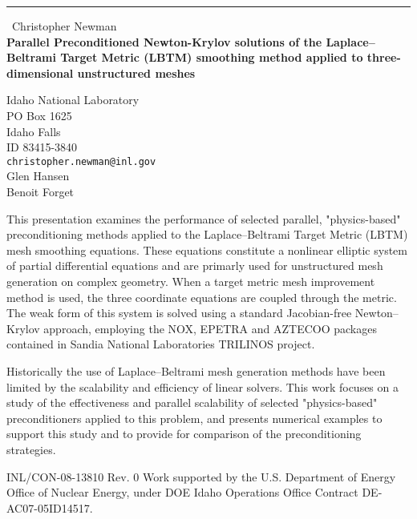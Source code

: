 \documentclass{report}
\begin{document}
\begin{center}
\rule{6in}{1pt} \
{\large Christopher Newman \\
{\bf Parallel Preconditioned Newton-Krylov solutions of the Laplace--Beltrami Target Metric (LBTM) smoothing method applied to three-dimensional unstructured meshes}}

Idaho National Laboratory \\ PO Box 1625 \\ Idaho Falls \\ ID 83415-3840
\\
{\tt christopher.newman@inl.gov}\\
Glen Hansen\\
Benoit Forget\end{center}

This presentation examines the performance of selected parallel,
"physics-based" preconditioning methods applied
to the Laplace--Beltrami Target Metric (LBTM) mesh smoothing equations.
These equations constitute a nonlinear elliptic
system of partial differential equations and are primarly used for unstructured mesh
generation on complex geometry. When a target metric mesh improvement
method is used, the three coordinate
equations are coupled through the metric. The weak form of this system
is solved using a standard Jacobian-free Newton--Krylov approach,
employing the NOX, EPETRA
and AZTECOO packages
contained in Sandia National Laboratories TRILINOS project.

Historically the use of Laplace--Beltrami mesh generation methods have been
limited by the scalability and efficiency of linear solvers.
This work focuses on a study
of the effectiveness and parallel scalability of selected "physics-based"
preconditioners applied to this
problem, and presents numerical examples to support this study
and to provide for comparison of the preconditioning strategies.

INL/CON-08-13810 Rev. 0
Work supported by the U.S. Department of Energy Office of Nuclear Energy,
under DOE Idaho Operations Office Contract DE-AC07-05ID14517.
\end{document}
